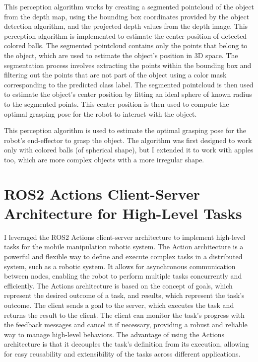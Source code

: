This perception algorithm works by creating a segmented pointcloud of the object from the depth map, using the
bounding box coordinates provided by the object detection algorithm, and the projected depth values
from the depth image. This perception algorithm is implemented to estimate the center position
of detected colored balls. 
The segmented pointcloud contains only the points that belong to the object, which are used
to estimate the object's position in 3D space. The segmentation process involves extracting the points within
the bounding box and filtering out the points that are not part of the object using a color mask corresponding
to the predicted class label. The segmented pointcloud is then used to estimate the object's center position
by fitting an ideal sphere of known radius to the segmented points. This center position is then
used to compute the optimal grasping pose for the robot to interact with the object.

This perception algorithm is used to estimate the optimal grasping pose for the robot's end-effector to grasp
the object. The algorithm was first designed to work only with colored balls (of spherical shape),
but I extended it to work with apples too, which are more complex objects with a more irregular shape.


\section{ROS2 Actions Client-Server Architecture for High-Level Tasks}

I leveraged the ROS2 Actions client-server architecture to implement high-level tasks for the mobile manipulation
robotic system. The Action architecture is a powerful and flexible way to define and execute complex tasks
in a distributed system, such as a robotic system. It allows for asynchronous communication between nodes,
enabling the robot to perform multiple tasks concurrently and efficiently. The Actions architecture is based on
the concept of goals, which represent the desired outcome of a task, and results, which represent the task's outcome.
The client sends a goal to the server, which executes the task and returns the result to the client. The client
can monitor the task's progress with the feedback messages and cancel it if necessary, providing a robust 
and reliable way to manage high-level behaviors. The advantage of using the Actions architecture is that it decouples
the task's definition from its execution, allowing for easy reusability and extensibility of the tasks
across different applications. 

